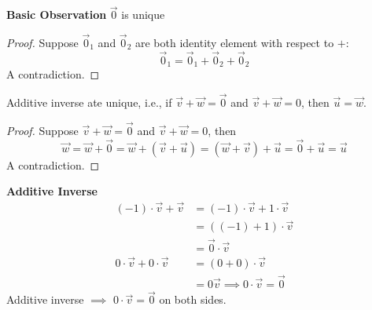 \textbf{Basic Observation}  
$\vec 0$ is unique 
\begin{proof}
    Suppose $\vec 0_1$ and $\vec 0_2$ are both identity element with respect to $+$:
    \[ \vec 0_1 = \vec 0_1 + \vec 0_2 + \vec 0_2\]
    A contradiction.
\end{proof}
Additive inverse ate unique, i.e., if $\vec v + \vec w = \vec 0$ and $\vec v + \vec w = 0$, then $\vec u = \vec w$. 
\begin{proof}
    Suppose $\vec v + \vec w = \vec 0$ and $\vec v + \vec w = 0$, then
    \[\vec w = \vec w + \vec 0 = \vec w + (\vec v + \vec u) = (\vec w + \vec v) + \vec u = \vec 0 + \vec u = \vec u\]
    A contradiction.
\end{proof}
\noindent \textbf{Additive Inverse} 
\begin{align*}
    (-1) \cdot \vec v + \vec v &= (-1) \cdot \vec v + 1 \cdot \vec v \\
    &= ((-1) + 1) \cdot \vec v \\
    &= \vec 0 \cdot \vec v \\
    0 \cdot \vec v + 0 \cdot \vec v &= (0 + 0) \cdot \vec v \\ &= 0 \vec v \implies \boxed{ 0 \cdot \vec v = \vec 0}
\end{align*} 
Additive inverse $\implies$ $0 \cdot \vec v = \vec 0$ on both sides. 
